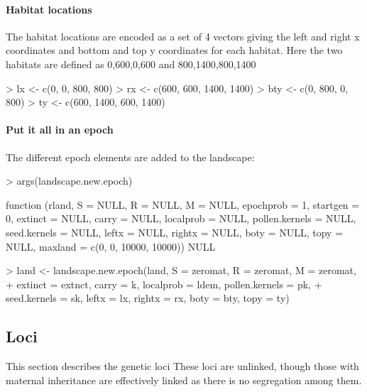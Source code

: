 \documentclass[10pt]{article}
\begin{document}
\paragraph{Habitat locations}
\label{sec:habitat-locations}
The habitat locations are encoded as a set of 4 vectors giving the
left and right x coordinates and  bottom and top y coordinates for each
habitat.  Here the two habitats are defined as 0,600,0,600 and 800,1400,800,1400
\begin{Schunk}
\begin{Sinput}
> lx <- c(0, 0, 800, 800)
> rx <- c(600, 600, 1400, 1400)
> bty <- c(0, 800, 0, 800)
> ty <- c(600, 1400, 600, 1400)
\end{Sinput}
\end{Schunk}

\paragraph{Put it all in an epoch}
\label{sec:put-it-all}


The different epoch elements are added to the landscape:

\begin{Schunk}
\begin{Sinput}
> args(landscape.new.epoch)
\end{Sinput}
\begin{Soutput}
function (rland, S = NULL, R = NULL, M = NULL, epochprob = 1, 
    startgen = 0, extinct = NULL, carry = NULL, localprob = NULL, 
    pollen.kernels = NULL, seed.kernels = NULL, leftx = NULL, 
    rightx = NULL, boty = NULL, topy = NULL, maxland = c(0, 0, 
        10000, 10000)) 
NULL
\end{Soutput}
\begin{Sinput}
> land <- landscape.new.epoch(land, S = zeromat, R = zeromat, M = zeromat, 
+     extinct = extnct, carry = k, localprob = ldem, pollen.kernels = pk, 
+     seed.kernels = sk, leftx = lx, rightx = rx, boty = bty, topy = ty)
\end{Sinput}
\end{Schunk}

\subsection{Loci}
\label{sec:loci}

This section describes the genetic loci These loci are unlinked,
though those with maternal inheritance are effectively linked as there is no segregation among them.
\end{document}
